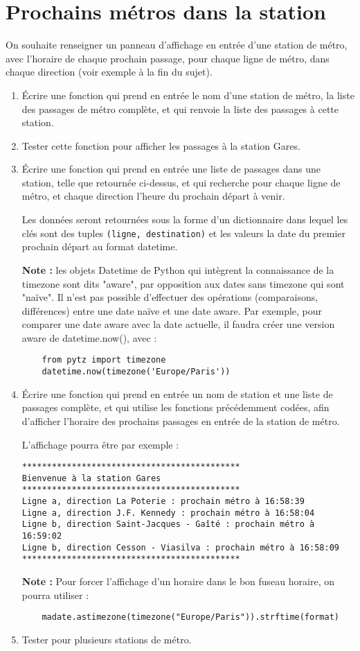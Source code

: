 \documentclass[11pt,a4paper]{article}
\begin{document}
\section{Prochains métros dans la station}


On souhaite renseigner un panneau d'affichage en entrée d'une station de métro, avec l'horaire de chaque prochain passage, pour chaque ligne de métro, dans chaque direction (voir exemple à la fin du sujet). 

\begin{enumerate}
    \item Écrire une fonction qui prend en entrée le nom d'une station de métro, la liste des passages de métro complète, et qui renvoie la liste des passages à cette station. 
    \item Tester cette fonction pour afficher les passages à la station Gares.
    
    \item Écrire une fonction qui prend en entrée une liste de passages dans une station, telle que retournée ci-dessus, et qui recherche pour chaque ligne de métro, et chaque direction l'heure du prochain départ à venir. 
    
    Les données seront retournées sous la forme d'un dictionnaire dans lequel les clés sont des tuples \verb+(ligne, destination)+ et les valeurs la date du premier prochain départ au format datetime. 
    
    \textbf{Note :} les objets Datetime de Python qui intègrent la connaissance de la timezone sont dits "aware", par opposition aux dates sans timezone qui sont "naïve". Il n'est pas possible d'effectuer des opérations (comparaisons, différences) entre une date naïve et une date aware. Par exemple, pour comparer une date aware avec la date actuelle, il faudra créer une version aware de datetime.now(), avec : 
\begin{verbatim}
    from pytz import timezone
    datetime.now(timezone('Europe/Paris'))
\end{verbatim}

    \item Écrire une fonction qui prend en entrée un nom de station et une liste de passages complète, et qui utilise les fonctions précédemment codées, afin d'afficher l'horaire des prochains passages en entrée de la station de métro. 
    
    L'affichage pourra être par exemple : 
    \begin{verbatim}
********************************************
Bienvenue à la station Gares
********************************************
Ligne a, direction La Poterie : prochain métro à 16:58:39
Ligne a, direction J.F. Kennedy : prochain métro à 16:58:04
Ligne b, direction Saint-Jacques - Gaîté : prochain métro à 16:59:02
Ligne b, direction Cesson - Viasilva : prochain métro à 16:58:09
********************************************
\end{verbatim}

\textbf{Note :} Pour forcer l'affichage d'un horaire dans le bon fuseau horaire, on pourra utiliser : 
\begin{verbatim}
    madate.astimezone(timezone("Europe/Paris")).strftime(format)
\end{verbatim}

\item Tester pour plusieurs stations de métro.
\end{enumerate}
\end{document}
